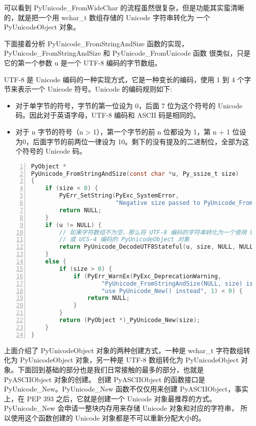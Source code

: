 可以看到 PyUnicode\_FromWideChar 的流程虽然很复杂，但是功能其实蛮清晰的，就是把一个用 wchar\_t 数组存储的 Unicode 字符串转化为
一个 PyUnicodeObject 对象。

下面接着分析 PyUnicode\_FromStringAndSize 函数的实现，PyUnicode\_FromStringAndSize 和 PyUnicode\_FromUnicode 函数
很类似，只是它的第一个参数 u 是一个 UTF-8 编码的字节数组。

\begin{definition} \label{def:int}
UTF-8 是 Unicode 编码的一种实现方式，它是一种变长的编码，使用 1 到 4 个字节来表示一个 Unicode 符号。Unicode 的编码规则如下:
\begin{itemize}
\item 对于单字节的符号，字节的第一位设为 0，后面 7 位为这个符号的 Unicode 码。因此对于英语字母，UTF-8 编码和 ASCII 码是相同的。
\item 对于 n 字节的符号（n > 1），第一个字节的前 n 位都设为 1，第 n + 1 位设为0，后面字节的前两位一律设为 10。剩下的没有提及的二进制位，全部为这个符号的 Unicode 码。
\end{itemize}
\end{definition}

\begin{lstlisting}[language=C, numbers=left, numbersep=1em, numberstyle=\footnotesize , breaklines=true]
PyObject *
PyUnicode_FromStringAndSize(const char *u, Py_ssize_t size)
{
    if (size < 0) {
        PyErr_SetString(PyExc_SystemError,
                        "Negative size passed to PyUnicode_FromStringAndSize");
        return NULL;
    }
    if (u != NULL) {
        // 如果字符数组不为空，那么将 UTF-8 编码的字符串转化为一个使用 UCS-1，UCS-2 
        // 或 UCS-4 编码的 PyUnicodeObject 对象
        return PyUnicode_DecodeUTF8Stateful(u, size, NULL, NULL);
    }
    else {
        if (size > 0) {
            if (PyErr_WarnEx(PyExc_DeprecationWarning,
                    "PyUnicode_FromStringAndSize(NULL, size) is deprecated; "
                    "use PyUnicode_New() instead", 1) < 0) {
                return NULL;
            }
        }
        return (PyObject *)_PyUnicode_New(size);
    }
}
\end{lstlisting}

上面介绍了 PyUnicodeObject 对象的两种创建方式，一种是 wchar\_t 字符数组转化为 PyUnicodeObject 对象，另一种是 UTF-8 
数组转化为 PyUnicodeObject 对象。下面回到基础的部分也是我们日常接触的最多的部分，也就是 PyASCIIObject 对象的创建。
创建 PyASCIIObject 的函数接口是 PyUnicode\_New。PyUnicode\_New 函数不仅仅用来创建 PyASCIIObject，事实上，在 PEP 393
之后，它就是创建一个 Unicode 对象最推荐的方式。PyUnicode\_New 会申请一整块内存用来存储 Unicode 对象和对应的字符串，
所以使用这个函数创建的 Unicode 对象都是不可以重新分配大小的。

